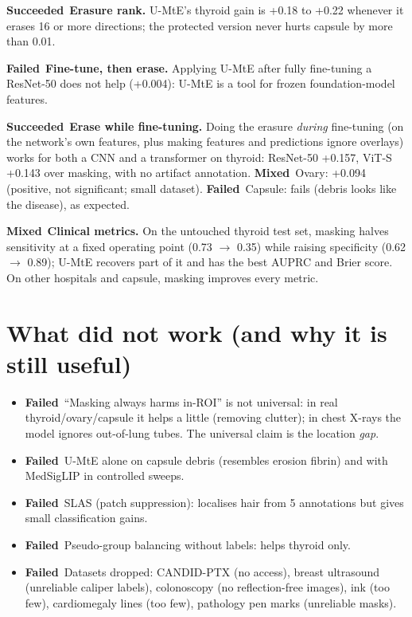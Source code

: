 \documentclass[11pt,a4paper]{article}
\newcommand{\ok}{\textcolor{green!50!black}{\textbf{Succeeded}}}
\newcommand{\no}{\textcolor{red!70!black}{\textbf{Failed}}}
\newcommand{\mixed}{\textcolor{orange!80!black}{\textbf{Mixed}}}
\begin{document}
\ok\ \textbf{Erasure rank.} U-MtE's thyroid gain is +0.18 to +0.22 whenever it erases 16 or more directions; the
protected version never hurts capsule by more than 0.01.

\no\ \textbf{Fine-tune, then erase.} Applying U-MtE after fully fine-tuning a ResNet-50 does not help (+0.004):
U-MtE is a tool for frozen foundation-model features.

\ok\ \textbf{Erase while fine-tuning.} Doing the erasure \emph{during} fine-tuning (on the network's own features, plus
making features and predictions ignore overlays) works for both a CNN and a transformer on thyroid: ResNet-50 +0.157,
ViT-S +0.143 over masking, with no artifact annotation. \mixed\ Ovary: +0.094 (positive, not significant; small
dataset). \no\ Capsule: fails (debris looks like the disease), as expected.

\mixed\ \textbf{Clinical metrics.} On the untouched thyroid test set, masking halves sensitivity at a fixed operating
point (0.73 $\to$ 0.35) while raising specificity (0.62 $\to$ 0.89); U-MtE recovers part of it and has the best AUPRC and
Brier score. On other hospitals and capsule, masking improves every metric.



\section{What did not work (and why it is still useful)}
\begin{itemize}[leftmargin=*]
\item \no\ ``Masking always harms in-ROI'' is not universal: in real thyroid/ovary/capsule it helps a little (removing
clutter); in chest X-rays the model ignores out-of-lung tubes. The universal claim is the location \emph{gap}.
\item \no\ U-MtE alone on capsule debris (resembles erosion fibrin) and with MedSigLIP in controlled sweeps.
\item \no\ SLAS (patch suppression): localises hair from 5 annotations but gives small classification gains.
\item \no\ Pseudo-group balancing without labels: helps thyroid only.
\item \no\ Datasets dropped: CANDID-PTX (no access), breast ultrasound (unreliable caliper labels), colonoscopy
(no reflection-free images), ink (too few), cardiomegaly lines (too few), pathology pen marks (unreliable masks).
\end{itemize}
\end{document}
